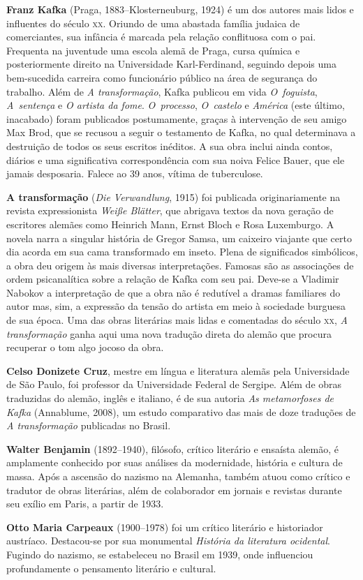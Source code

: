 \textbf{Franz Kafka} (Praga, 1883--Klosterneuburg, 1924) é um dos autores mais lidos 
e influentes do século \textsc{xx}. Oriundo de uma abastada família judaica de
comerciantes, sua infância é marcada pela relação conflituosa com o pai.
Frequenta na juventude uma escola alemã de Praga, cursa química e
posteriormente direito na Universidade Karl{}-Ferdinand, seguindo depois 
uma bem{}-sucedida carreira como funcionário público na área de segurança do trabalho. 
Além de \textit{A transformação}, Kafka publicou em vida \textit{O~foguista}, \textit{A~sentença} e \textit{O artista da fome}. \textit{O~processo}, \textit{O~castelo} e \textit{América} 
(este último, inacabado) foram publicados postumamente, graças à intervenção de 
seu amigo Max Brod, que se recusou a seguir o testamento de Kafka, no qual 
determinava a destruição de todos os seus escritos inéditos. A sua obra inclui
ainda contos, diários e uma significativa correspondência com sua noiva Felice
Bauer, que ele jamais desposaria. Falece ao 39 anos, vítima de tuberculose.

\textbf{A transformação} (\textit{Die Verwandlung}, 1915) foi publicada
originariamente na revista expressionista \textit{Weiße Blätter}, que abrigava
textos da nova geração de escritores alemães como Heinrich Mann, Ernst Bloch e
Rosa Luxemburgo. A novela narra a singular história de Gregor Samsa, um caixeiro
viajante que certo dia acorda em sua cama transformado em inseto. Plena de
significados simbólicos, a obra deu origem às mais diversas interpretações.
Famosas são as associações de ordem psicanalítica sobre a relação de Kafka 
com seu pai. Deve{}-se a Vladimir Nabokov a interpretação de que a obra não é
redutível a dramas familiares do autor mas, sim, a expressão da tensão do artista
em meio à sociedade burguesa de sua época. Uma das obras literárias mais lidas e comentadas
do século \textsc{xx}, \textit{A transformação} ganha aqui uma nova tradução direta do
alemão que procura recuperar o tom algo jocoso da obra.
        
\textbf{Celso Donizete Cruz}, mestre em língua e literatura alemãs pela Universidade de São Paulo, foi professor da Universidade Federal de Sergipe. Além de obras traduzidas do alemão, inglês e italiano, é de sua autoria \textit{As metamorfoses de Kafka} (Annablume, 2008), um estudo comparativo das mais de doze traduções de \textit{A transformação} publicadas no Brasil.

\textbf{Walter Benjamin} (1892--1940), filósofo, crítico literário e ensaísta alemão, é amplamente conhecido por suas análises da modernidade, história e cultura de massa. Após a ascensão do nazismo na Alemanha, também atuou como crítico e tradutor de obras literárias, além de colaborador em jornais e revistas durante seu exílio em Paris, a partir de 1933.

\textbf{Otto Maria Carpeaux} (1900--1978) foi um crítico literário e historiador austríaco. Destacou-se por sua monumental \textit{História da literatura ocidental}. Fugindo do nazismo, se estabeleceu no Brasil em 1939, onde influenciou profundamente o pensamento literário e cultural.


